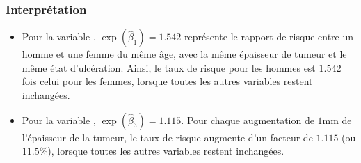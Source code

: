 \documentclass{beamer}
\begin{document}
\begin{frame}
\frametitle{Interprétation}
\begin{itemize}
\item Pour la variable , $\exp(\widehat{\beta}_1)=1.542$ représente le rapport de risque entre un homme et une femme du même âge, avec la même épaisseur de tumeur et le même état d'ulcération. Ainsi, le taux de risque pour les hommes est $1.542$ fois celui pour les femmes, lorsque toutes les autres variables restent inchangées.
\item Pour la variable , $\exp(\widehat{\beta}_3)=1.115$. Pour chaque augmentation de $1$mm de l'épaisseur de la tumeur, le taux de risque augmente d'un facteur de $1.115$ (ou $11.5$\%), lorsque toutes les autres variables restent inchangées. 
\end{itemize}
\end{frame}
% 
% 
% 
\end{document}
